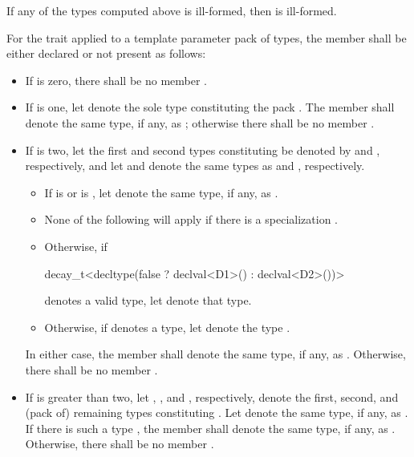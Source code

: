 If any of the types computed above is ill-formed, then
 is ill-formed.

\pnum
For the  trait applied to a template parameter pack  of types,
the member  shall be either declared or not present as follows:

\begin{itemize}
\item If  is zero, there shall be no member .

\item If  is one, let  denote the sole type
constituting the pack .
The member   shall denote the same
type, if any, as ;
otherwise there shall be no member .

\item If  is two,
let the first and second types constituting  be denoted
by  and , respectively, and
let  and  denote
the same types as  and , respectively.
  \begin{itemize}
  \item If  is  or
      is ,
     let  denote the same type, if any,
     as .
  \item
    \begin{note}
      None of the following will apply if there is a specialization
      .
    \end{note}
  \item Otherwise, if
\begin{codeblock}
decay_t<decltype(false ? declval<D1>() : declval<D2>())>
\end{codeblock}
    denotes a valid type, let  denote that type.
  \item Otherwise, if
    denotes a type, let  denote the type
    .
  \end{itemize}
In either case, the member   shall denote
the same type, if any, as .
Otherwise, there shall be no member .

\item If  is greater than two,
let , , and , respectively,
denote the first, second, and (pack of) remaining types constituting .
Let  denote the same type, if any, as .
If there is such a type , the member  
shall denote the same type, if any, as .
Otherwise, there shall be no member .
\end{itemize}

